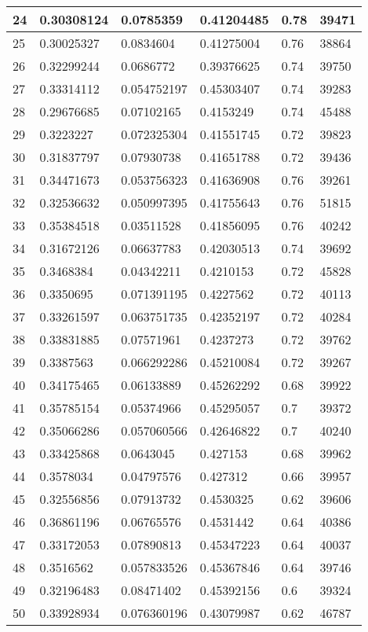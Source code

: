 \begin{longtable}{|l|l|l|l|l|l|}
24 & 0.30308124 & 0.0785359 & 0.41204485 & 0.78 & 39471 \\ \hline 
25 & 0.30025327 & 0.0834604 & 0.41275004 & 0.76 & 38864 \\ \hline 
26 & 0.32299244 & 0.0686772 & 0.39376625 & 0.74 & 39750 \\ \hline 
27 & 0.33314112 & 0.054752197 & 0.45303407 & 0.74 & 39283 \\ \hline 
28 & 0.29676685 & 0.07102165 & 0.4153249 & 0.74 & 45488 \\ \hline 
29 & 0.3223227 & 0.072325304 & 0.41551745 & 0.72 & 39823 \\ \hline 
30 & 0.31837797 & 0.07930738 & 0.41651788 & 0.72 & 39436 \\ \hline 
31 & 0.34471673 & 0.053756323 & 0.41636908 & 0.76 & 39261 \\ \hline 
32 & 0.32536632 & 0.050997395 & 0.41755643 & 0.76 & 51815 \\ \hline 
33 & 0.35384518 & 0.03511528 & 0.41856095 & 0.76 & 40242 \\ \hline 
34 & 0.31672126 & 0.06637783 & 0.42030513 & 0.74 & 39692 \\ \hline 
35 & 0.3468384 & 0.04342211 & 0.4210153 & 0.72 & 45828 \\ \hline 
36 & 0.3350695 & 0.071391195 & 0.4227562 & 0.72 & 40113 \\ \hline 
37 & 0.33261597 & 0.063751735 & 0.42352197 & 0.72 & 40284 \\ \hline 
38 & 0.33831885 & 0.07571961 & 0.4237273 & 0.72 & 39762 \\ \hline 
39 & 0.3387563 & 0.066292286 & 0.45210084 & 0.72 & 39267 \\ \hline 
40 & 0.34175465 & 0.06133889 & 0.45262292 & 0.68 & 39922 \\ \hline 
41 & 0.35785154 & 0.05374966 & 0.45295057 & 0.7 & 39372 \\ \hline 
42 & 0.35066286 & 0.057060566 & 0.42646822 & 0.7 & 40240 \\ \hline 
43 & 0.33425868 & 0.0643045 & 0.427153 & 0.68 & 39962 \\ \hline 
44 & 0.3578034 & 0.04797576 & 0.427312 & 0.66 & 39957 \\ \hline 
45 & 0.32556856 & 0.07913732 & 0.4530325 & 0.62 & 39606 \\ \hline 
46 & 0.36861196 & 0.06765576 & 0.4531442 & 0.64 & 40386 \\ \hline 
47 & 0.33172053 & 0.07890813 & 0.45347223 & 0.64 & 40037 \\ \hline 
48 & 0.3516562 & 0.057833526 & 0.45367846 & 0.64 & 39746 \\ \hline 
49 & 0.32196483 & 0.08471402 & 0.45392156 & 0.6 & 39324 \\ \hline 
50 & 0.33928934 & 0.076360196 & 0.43079987 & 0.62 & 46787 \\ \hline 
\end{longtable}